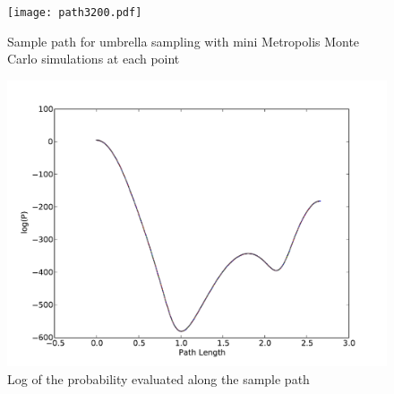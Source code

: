 \documentclass[letterpaper]{article}
\begin{document}
\begin{figure}[h]
\begin{center}
\texttt{[image: path3200.pdf]}
\end{center}
\caption{Sample path for umbrella sampling with mini Metropolis Monte Carlo
simulations at each point}
\label{fig:path}
\end{figure}

\begin{figure}[h]
\begin{center}
\includegraphics[width=7.5in]{logP3200.pdf}
\end{center}
\caption{Log of the probability evaluated along the sample path}
\label{fig:logP}
\end{figure}

\newpage 
\clearpage

\end{document}
